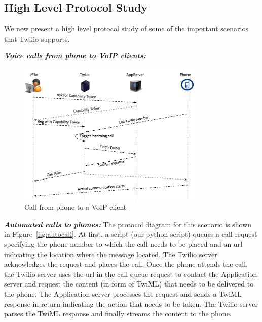 \subsection{High Level Protocol Study}
\label{subsec-protostudy}
We now present a high level protocol study of some of the important scenarios that Twilio supports. 

 
\emph{\textbf{Voice calls from phone to VoIP clients:} }
\begin{figure}[t!] 
\centering
  \includegraphics[width=0.8\textwidth]{figs/p2c.pdf}
\caption{Call from phone to a VoIP client}
\label{fig:callfromphone}
\end{figure}
\emph{\textbf{Automated calls to phones:} }
The protocol diagram for this scenario is shown in  Figure~\ref{fig:autocall}. At first, a script (our python script) queues a call request specifying the phone number to which the call needs to be placed and an url indicating the location where the message located. The Twilio server acknowledges the request and places the call. Once the phone attends the call, the Twilio server uses the url in the call queue request to contact the Application server and request the content (in form of TwiML) that needs to be delivered to the phone. The Application server processes the request and sends a TwiML response in return indicating the action that needs to be taken. The Twilio server parses the TwiML response and finally streams the content to the phone.  


